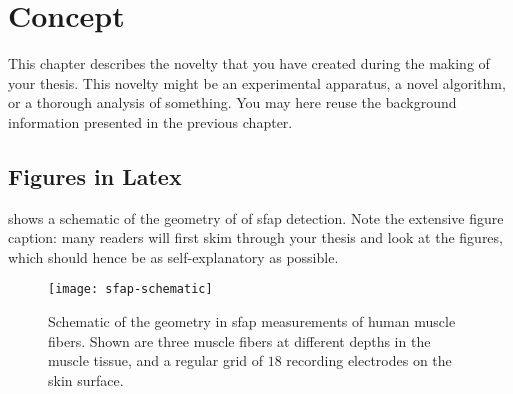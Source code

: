 \chapter{Concept}
\label{chap:concept}

This chapter describes the novelty that you have created during the making of your thesis.
This novelty might be an experimental apparatus, a novel algorithm, or a thorough analysis of something.
You may here reuse the background information presented in the previous chapter.

\section{Figures in Latex}
 shows a schematic of the geometry of of \gls{sfap} detection.
Note the extensive figure caption: many readers will first skim through your thesis and look at the figures, which should hence be as self-explanatory as possible.
\begin{figure}
  \centering
  \texttt{[image: sfap-schematic]}
  \caption[Geometry of Single Fiber Action Potential (SFAP) measurements]{Schematic of the geometry in \acrfull{sfap} measurements of human muscle fibers. Shown are three muscle fibers at different depths in the muscle tissue, and a regular grid of $18$ recording electrodes on the skin surface.}
  \label{fig:sfap-schematic}
\end{figure}

